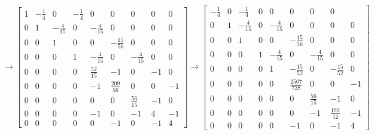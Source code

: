 \documentclass[a4paper]{article}
\begin{document}
$$
\rightarrow\left[\begin{array}{ccccccccc}
	1 & -\frac{1}{4} & 0 & -\frac{1}{4} & 0 & 0 & 0 & 0 & 0 \\
	0 & 1 & -\frac{4}{15} & 0 & -\frac{4}{15} & 0 & 0 & 0 & 0 \\
	0 & 0 & 1 & 0 & 0 & -\frac{15}{56} & 0 & 0 & 0 \\
	0 & 0 & 0 & 1 & -\frac{4}{15} & 0 & -\frac{4}{15} & 0 & 0 \\
	0 & 0 & 0 & 0 & \frac{52}{15} & -1 & 0 & -1 & 0 \\
	0 & 0 & 0 & 0 & -1 & \frac{209}{56} & 0 & 0 & -1 \\
	0 & 0 & 0 & 0 & 0 & 0 & \frac{56}{15} & -1 & 0 \\
	0 & 0 & 0 & 0 & -1 & 0 & -1 & 4 & -1 \\
	0 & 0 & 0 & 0 & 0 & -1 & 0 & -1 & 4
\end{array}\right] \rightarrow\left[\begin{array}{ccccccccc}
	-\frac{1}{4} & 0 & -\frac{1}{4} & 0 & 0 & 0 & 0 & 0 \\
	0 & 1 & -\frac{4}{15} & 0 & -\frac{4}{15} & 0 & 0 & 0 & 0 \\
	0 & 0 & 1 & 0 & 0 & -\frac{15}{56} & 0 & 0 & 0 \\
	0 & 0 & 0 & 1 & -\frac{4}{15} & 0 & -\frac{4}{15} & 0 & 0 \\
	0 & 0 & 0 & 0 & 1 & -\frac{15}{52} & 0 & -\frac{15}{52} & 0 \\
	0 & 0 & 0 & 0 & 0 & \frac{2507}{728} & 0 & 0 & -1 \\
	0 & 0 & 0 & 0 & 0 & 0 & \frac{56}{15} & -1 & 0 \\
	0 & 0 & 0 & 0 & 0 & 0 & -1 & \frac{193}{52} & -1 \\
	0 & 0 & 0 & 0 & 0 & -1 & 0 & -1 & 4
\end{array}\right]
$$
\end{document}
